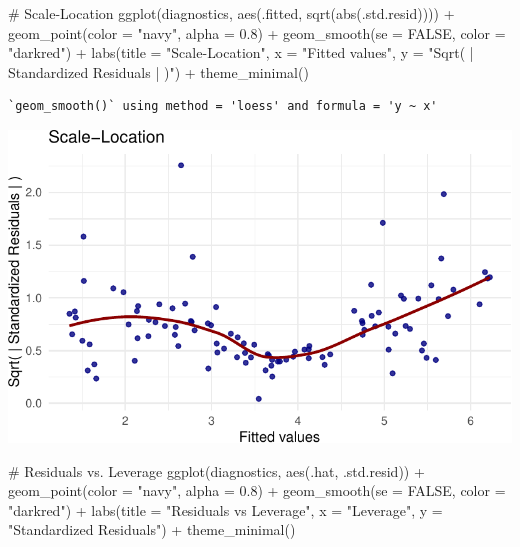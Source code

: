 \documentclass[
  11pt,
]{article}
\newenvironment{Shaded}{\begin{snugshade}}{\end{snugshade}}
\newcommand{\AttributeTok}[1]{\textcolor[rgb]{0.40,0.45,0.13}{#1}}
\newcommand{\CommentTok}[1]{\textcolor[rgb]{0.37,0.37,0.37}{#1}}
\newcommand{\ConstantTok}[1]{\textcolor[rgb]{0.56,0.35,0.01}{#1}}
\newcommand{\FloatTok}[1]{\textcolor[rgb]{0.68,0.00,0.00}{#1}}
\newcommand{\FunctionTok}[1]{\textcolor[rgb]{0.28,0.35,0.67}{#1}}
\newcommand{\NormalTok}[1]{\textcolor[rgb]{0.00,0.23,0.31}{#1}}
\newcommand{\SpecialCharTok}[1]{\textcolor[rgb]{0.37,0.37,0.37}{#1}}
\newcommand{\StringTok}[1]{\textcolor[rgb]{0.13,0.47,0.30}{#1}}
\begin{document}
\begin{Shaded}
\begin{Highlighting}[]
\CommentTok{\# Scale{-}Location }
\FunctionTok{ggplot}\NormalTok{(diagnostics, }\FunctionTok{aes}\NormalTok{(.fitted, }\FunctionTok{sqrt}\NormalTok{(}\FunctionTok{abs}\NormalTok{(.std.resid)))) }\SpecialCharTok{+}
  \FunctionTok{geom\_point}\NormalTok{(}\AttributeTok{color =} \StringTok{"navy"}\NormalTok{, }\AttributeTok{alpha =} \FloatTok{0.8}\NormalTok{) }\SpecialCharTok{+}
  \FunctionTok{geom\_smooth}\NormalTok{(}\AttributeTok{se =} \ConstantTok{FALSE}\NormalTok{, }\AttributeTok{color =} \StringTok{"darkred"}\NormalTok{) }\SpecialCharTok{+}
  \FunctionTok{labs}\NormalTok{(}\AttributeTok{title =} \StringTok{"Scale{-}Location"}\NormalTok{, }\AttributeTok{x =} \StringTok{"Fitted values"}\NormalTok{, }
       \AttributeTok{y =} \StringTok{"Sqrt( | Standardized Residuals | )"}\NormalTok{) }\SpecialCharTok{+}
  \FunctionTok{theme\_minimal}\NormalTok{()}
\end{Highlighting}
\end{Shaded}

\begin{verbatim}
`geom_smooth()` using method = 'loess' and formula = 'y ~ x'
\end{verbatim}

\includegraphics{HW-4-CODE-and-ANSWERS_files/figure-pdf/unnamed-chunk-3-1.pdf}

\begin{Shaded}
\begin{Highlighting}[]
\CommentTok{\# Residuals vs. Leverage}
\FunctionTok{ggplot}\NormalTok{(diagnostics, }\FunctionTok{aes}\NormalTok{(.hat, .std.resid)) }\SpecialCharTok{+}
  \FunctionTok{geom\_point}\NormalTok{(}\AttributeTok{color =} \StringTok{"navy"}\NormalTok{, }\AttributeTok{alpha =} \FloatTok{0.8}\NormalTok{) }\SpecialCharTok{+}
  \FunctionTok{geom\_smooth}\NormalTok{(}\AttributeTok{se =} \ConstantTok{FALSE}\NormalTok{, }\AttributeTok{color =} \StringTok{"darkred"}\NormalTok{) }\SpecialCharTok{+}
  \FunctionTok{labs}\NormalTok{(}\AttributeTok{title =} \StringTok{"Residuals vs Leverage"}\NormalTok{, }\AttributeTok{x =} \StringTok{"Leverage"}\NormalTok{, }
       \AttributeTok{y =} \StringTok{"Standardized Residuals"}\NormalTok{) }\SpecialCharTok{+}
  \FunctionTok{theme\_minimal}\NormalTok{()}
\end{Highlighting}
\end{Shaded}
\end{document}
